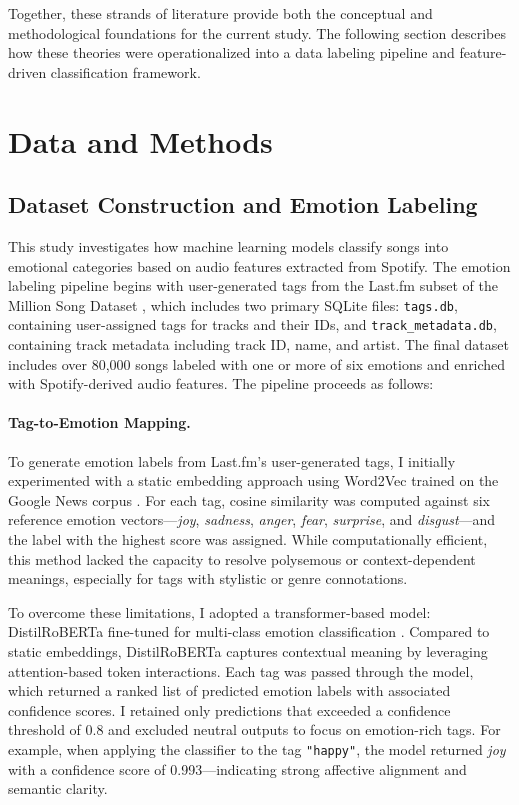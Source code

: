 \documentclass{article}
\begin{document}
Together, these strands of literature provide both the conceptual and methodological foundations for the current study. The following section describes how these theories were operationalized into a data labeling pipeline and feature-driven classification framework.

\section{Data and Methods}

\subsection{Dataset Construction and Emotion Labeling}

This study investigates how machine learning models classify songs into emotional categories based on audio features extracted from Spotify. The emotion labeling pipeline begins with user-generated tags from the Last.fm subset of the Million Song Dataset \parencite{MillionSongDataset}, which includes two primary SQLite files: \texttt{tags.db}, containing user-assigned tags for tracks and their IDs, and \texttt{track\_metadata.db}, containing track metadata including track ID, name, and artist. The final dataset includes over 80,000 songs labeled with one or more of six emotions and enriched with Spotify-derived audio features. The pipeline proceeds as follows:

\paragraph{Tag-to-Emotion Mapping.}

To generate emotion labels from Last.fm’s user-generated tags, I initially experimented with a static embedding approach using Word2Vec trained on the Google News corpus \parencite{Mikolov2013}. For each tag, cosine similarity was computed against six reference emotion vectors—\textit{joy}, \textit{sadness}, \textit{anger}, \textit{fear}, \textit{surprise}, and \textit{disgust}—and the label with the highest score was assigned. While computationally efficient, this method lacked the capacity to resolve polysemous or context-dependent meanings, especially for tags with stylistic or genre connotations.

To overcome these limitations, I adopted a transformer-based model: DistilRoBERTa fine-tuned for multi-class emotion classification \parencite{Hartman2022}. Compared to static embeddings, DistilRoBERTa captures contextual meaning by leveraging attention-based token interactions. Each tag was passed through the model, which returned a ranked list of predicted emotion labels with associated confidence scores. I retained only predictions that exceeded a confidence threshold of 0.8 and excluded neutral outputs to focus on emotion-rich tags. For example, when applying the classifier to the tag \texttt{"happy"}, the model returned \textit{joy} with a confidence score of 0.993—indicating strong affective alignment and semantic clarity.
\end{document}
